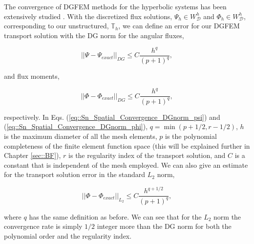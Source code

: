 The convergence of DGFEM methods for the hyperbolic systems has been extensively studied \cite{lesaint1974finite,houston2000stabilized,houston2002discontinuous,wang2009convergence}. With the discretized flux solutions, $\Psi_h \in W^h_{\mathcal{D}}$ and $\Phi_h \in W^h_{\mathcal{D}}$, corresponding to our unstructured, $\mathbb{T}_h$, we can define an error for our DGFEM transport solution with the DG norm for the angular fluxes,


\begin{equation}
\label{eq::Sn_Spatial_Convergence_DGnorm_psi}
|| \Psi - \Psi_{exact} ||_{DG} \leq C \frac{h^q}{(p+1)^q},
\end{equation}

\noindent and flux moments,

\begin{equation}
\label{eq::Sn_Spatial_Convergence_DGnorm_phi}
|| \Phi - \Phi_{exact} ||_{DG} \leq C \frac{h^q}{(p+1)^q},
\end{equation}

\noindent respectively. In Eqs. (\ref{eq::Sn_Spatial_Convergence_DGnorm_psi}) and (\ref{eq::Sn_Spatial_Convergence_DGnorm_phi}), $q = \min (p+1/2, r - 1/2)$, $h$ is the maximum diameter of all the mesh elements, $p$ is the polynomial completeness of the finite element function space (this will be explained further in Chapter \ref{sec::BF}), $r$ is the regularity index of the transport solution, and $C$ is a constant that is independent of the mesh employed. We can also give an estimate for the transport solution error in the standard $L_2$ norm,

\begin{equation}
\label{eq::Sn_Spatial_Convergence_L2norm_phi}
|| \Phi - \Phi_{exact} ||_{L_2} \leq C \frac{h^{q+1/2}}{(p+1)^q},
\end{equation}

\noindent where $q$ has the same definition as before. We can see that for the $L_2$ norm the convergence rate is simply $1/2$ integer more than the DG norm for both the polynomial order and the regularity index.

